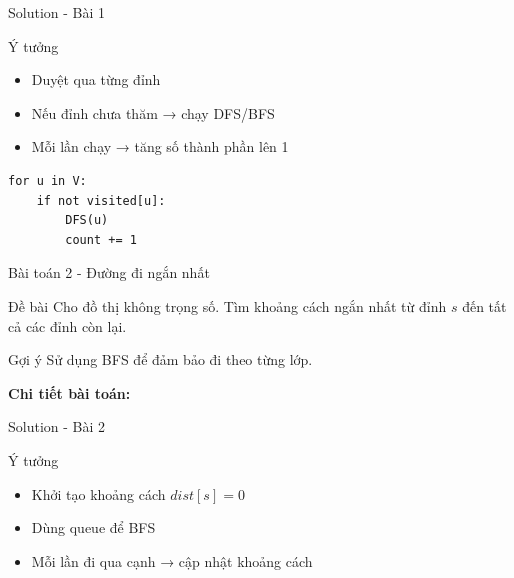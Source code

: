 \documentclass{beamer}
\begin{document}
\begin{frame}[fragile]{Solution - Bài 1}

\begin{block}{Ý tưởng}
\begin{itemize}
    \item Duyệt qua từng đỉnh
    \item Nếu đỉnh chưa thăm → chạy DFS/BFS
    \item Mỗi lần chạy → tăng số thành phần lên 1
\end{itemize}
\end{block}

\pause

\begin{tcolorbox}[colback=black!5!white,colframe=blue!75!black,title=Mã giả DFS]
\begin{verbatim}
for u in V:
    if not visited[u]:
        DFS(u)
        count += 1
\end{verbatim}
\end{tcolorbox}

\end{frame}

\begin{frame}{Bài toán 2 - Đường đi ngắn nhất}

\begin{block}{Đề bài}
Cho đồ thị không trọng số.  
Tìm khoảng cách ngắn nhất từ đỉnh $s$ đến tất cả các đỉnh còn lại.
\end{block}

\pause

\begin{alertblock}{Gợi ý}
Sử dụng BFS để đảm bảo đi theo từng lớp.
\end{alertblock}

\pause

\begin{center}
\textbf{Chi tiết bài toán:}

\vspace{0.3cm}

\href{https://codeforces.com/problemset/problem/20/C}{\color{blue}{Click để thử sức}}
\end{center}

\end{frame}

\begin{frame}[fragile]{Solution - Bài 2}

\begin{block}{Ý tưởng}
\begin{itemize}
    \item Khởi tạo khoảng cách $dist[s] = 0$
    \item Dùng queue để BFS
    \item Mỗi lần đi qua cạnh → cập nhật khoảng cách
\end{itemize}
\end{block}


\end{frame}
\end{document}
